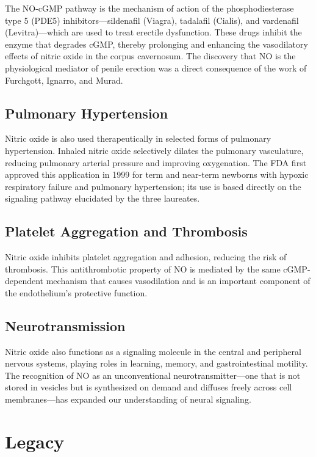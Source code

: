 The NO-cGMP pathway is the mechanism of action of the phosphodiesterase type 5 (PDE5) inhibitors---sildenafil (Viagra), tadalafil (Cialis), and vardenafil (Levitra)---which are used to treat erectile dysfunction. These drugs inhibit the enzyme that degrades cGMP, thereby prolonging and enhancing the vasodilatory effects of nitric oxide in the corpus cavernosum. The discovery that NO is the physiological mediator of penile erection was a direct consequence of the work of Furchgott, Ignarro, and Murad.

\subsection{Pulmonary Hypertension}

Nitric oxide is also used therapeutically in selected forms of pulmonary hypertension. Inhaled nitric oxide selectively dilates the pulmonary vasculature, reducing pulmonary arterial pressure and improving oxygenation. The FDA first approved this application in 1999 for term and near-term newborns with hypoxic respiratory failure and pulmonary hypertension; its use is based directly on the signaling pathway elucidated by the three laureates.

\subsection{Platelet Aggregation and Thrombosis}

Nitric oxide inhibits platelet aggregation and adhesion, reducing the risk of thrombosis. This antithrombotic property of NO is mediated by the same cGMP-dependent mechanism that causes vasodilation and is an important component of the endothelium's protective function.

\subsection{Neurotransmission}

Nitric oxide also functions as a signaling molecule in the central and peripheral nervous systems, playing roles in learning, memory, and gastrointestinal motility. The recognition of NO as an unconventional neurotransmitter---one that is not stored in vesicles but is synthesized on demand and diffuses freely across cell membranes---has expanded our understanding of neural signaling.

\section{Legacy}

